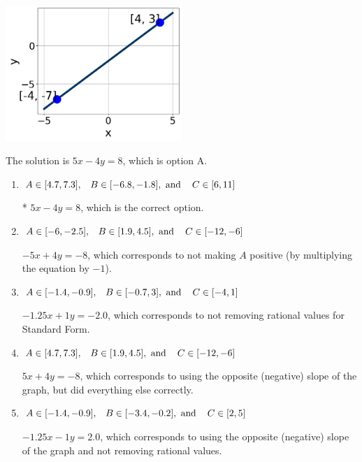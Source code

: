\documentclass{extbook}[14pt]
\begin{document}
\begin{enumerate}
{\begin{center}
    \includegraphics[width=0.5\textwidth]{../Figures/linearGraphToStandardB.png}
\end{center}


The solution is \( 5x - 4y = 8 \), which is option A.\begin{enumerate}[label=\Alph*.]
\item \( A \in [4.7, 7.3], \hspace{3mm} B \in [-6.8, -1.8], \text{ and } \hspace{3mm} C \in [6, 11] \)

* $5x - 4y = 8$, which is the correct option.
\item \( A \in [-6, -2.5], \hspace{3mm} B \in [1.9, 4.5], \text{ and } \hspace{3mm} C \in [-12, -6] \)

 $-5x + 4y = -8$, which corresponds to not making $A$ positive (by multiplying the equation by $-1$).
\item \( A \in [-1.4, -0.9], \hspace{3mm} B \in [-0.7, 3], \text{ and } \hspace{3mm} C \in [-4, 1] \)

 $-1.25x + 1y = -2.0$, which corresponds to not removing rational values for Standard Form.
\item \( A \in [4.7, 7.3], \hspace{3mm} B \in [1.9, 4.5], \text{ and } \hspace{3mm} C \in [-12, -6] \)

 $5x + 4y = -8$, which corresponds to using the opposite (negative) slope of the graph, but did everything else correctly.
\item \( A \in [-1.4, -0.9], \hspace{3mm} B \in [-3.4, -0.2], \text{ and } \hspace{3mm} C \in [2, 5] \)

 $-1.25x - 1y = 2.0$, which corresponds to using the opposite (negative) slope of the graph and not removing rational values.
\end{enumerate}

}
\end{enumerate}
\end{document}
